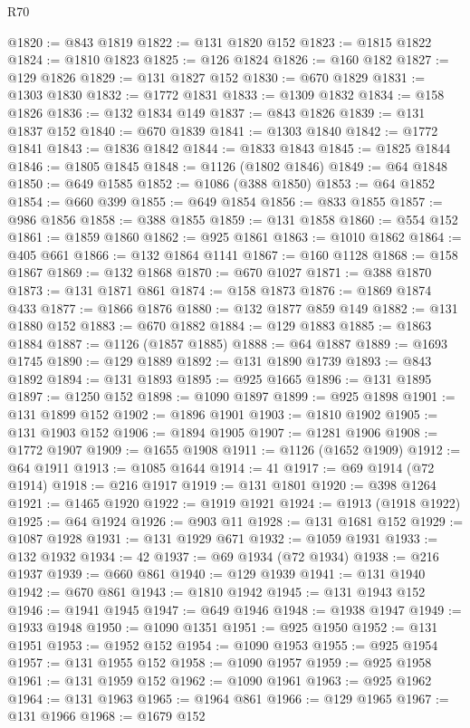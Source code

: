 \begin{lexlean}{R70}
\begin{coremodule}
@1820 := @843 @1819
@1822 := @131 @1820 @152
@1823 := @1815 @1822
@1824 := @1810 @1823
@1825 := @126 @1824
@1826 := @160 @182
@1827 := @129 @1826
@1829 := @131 @1827 @152
@1830 := @670 @1829
@1831 := @1303 @1830
@1832 := @1772 @1831
@1833 := @1309 @1832
@1834 := @158 @1826
@1836 := @132 @1834 @149
@1837 := @843 @1826
@1839 := @131 @1837 @152
@1840 := @670 @1839
@1841 := @1303 @1840
@1842 := @1772 @1841
@1843 := @1836 @1842
@1844 := @1833 @1843
@1845 := @1825 @1844
@1846 := @1805 @1845
@1848 := @1126 (@1802 @1846)
@1849 := @64 @1848
@1850 := @649 @1585
@1852 := @1086 (@388 @1850)
@1853 := @64 @1852
@1854 := @660 @399
@1855 := @649 @1854
@1856 := @833 @1855
@1857 := @986 @1856
@1858 := @388 @1855
@1859 := @131 @1858
@1860 := @554 @152
@1861 := @1859 @1860
@1862 := @925 @1861
@1863 := @1010 @1862
@1864 := @405 @661
@1866 := @132 @1864 @1141
@1867 := @160 @1128
@1868 := @158 @1867
@1869 := @132 @1868
@1870 := @670 @1027
@1871 := @388 @1870
@1873 := @131 @1871 @861
@1874 := @158 @1873
@1876 := @1869 @1874 @433
@1877 := @1866 @1876
@1880 := @132 @1877 @859 @149
@1882 := @131 @1880 @152
@1883 := @670 @1882
@1884 := @129 @1883
@1885 := @1863 @1884
@1887 := @1126 (@1857 @1885)
@1888 := @64 @1887
@1889 := @1693 @1745
@1890 := @129 @1889
@1892 := @131 @1890 @1739
@1893 := @843 @1892
@1894 := @131 @1893
@1895 := @925 @1665
@1896 := @131 @1895
@1897 := @1250 @152
@1898 := @1090 @1897
@1899 := @925 @1898
@1901 := @131 @1899 @152
@1902 := @1896 @1901
@1903 := @1810 @1902
@1905 := @131 @1903 @152
@1906 := @1894 @1905
@1907 := @1281 @1906
@1908 := @1772 @1907
@1909 := @1655 @1908
@1911 := @1126 (@1652 @1909)
@1912 := @64 @1911
@1913 := @1085 @1644
@1914 := 41
@1917 := @69 @1914 (@72 @1914)
@1918 := @216 @1917
@1919 := @131 @1801
@1920 := @398 @1264
@1921 := @1465 @1920
@1922 := @1919 @1921
@1924 := @1913 (@1918 @1922)
@1925 := @64 @1924
@1926 := @903 @11
@1928 := @131 @1681 @152
@1929 := @1087 @1928
@1931 := @131 @1929 @671
@1932 := @1059 @1931
@1933 := @132 @1932
@1934 := 42
@1937 := @69 @1934 (@72 @1934)
@1938 := @216 @1937
@1939 := @660 @861
@1940 := @129 @1939
@1941 := @131 @1940
@1942 := @670 @861
@1943 := @1810 @1942
@1945 := @131 @1943 @152
@1946 := @1941 @1945
@1947 := @649 @1946
@1948 := @1938 @1947
@1949 := @1933 @1948
@1950 := @1090 @1351
@1951 := @925 @1950
@1952 := @131 @1951
@1953 := @1952 @152
@1954 := @1090 @1953
@1955 := @925 @1954
@1957 := @131 @1955 @152
@1958 := @1090 @1957
@1959 := @925 @1958
@1961 := @131 @1959 @152
@1962 := @1090 @1961
@1963 := @925 @1962
@1964 := @131 @1963
@1965 := @1964 @861
@1966 := @129 @1965
@1967 := @131 @1966
@1968 := @1679 @152

\end{coremodule}
\end{lexlean}
